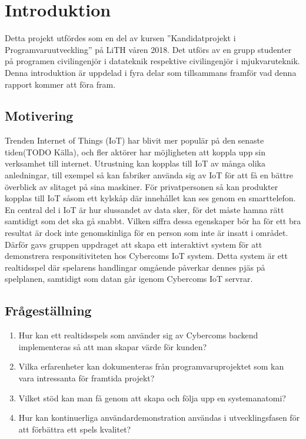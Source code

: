\chapter{Introduktion}
\label{cha:introduction}

Detta projekt utfördes som en del av kursen ''Kandidatprojekt i Programvaruutveckling'' på LiTH våren 2018. Det utförs av en grupp studenter på programen civilingenjör i datateknik respektive civilingenjör i mjukvaruteknik. 
Denna introduktion är uppdelad i fyra delar som tillsammans framför vad denna rapport kommer att föra fram. 

\section{Motivering}
\label{sec:motivation}
Trenden Internet of Things (IoT) har blivit mer populär på den senaste tiden(TODO Källa), och fler aktörer har möjligheten att koppla upp sin verksamhet till internet. Utrustning kan kopplas till IoT av många olika anledningar, till exempel så kan fabriker använda sig av IoT för att få en bättre överblick av slitaget på sina maskiner. För privatpersonen så kan produkter kopplas till IoT såsom ett kylskåp där innehållet kan ses genom en smarttelefon. En central del i IoT är hur slussandet av data sker, för det måste hamna rätt samtidigt som det ska gå snabbt. Vilken siffra dessa egenskaper bör ha för ett bra resultat är dock inte genomskinliga för en person som inte är insatt i området. Därför gavs gruppen uppdraget att skapa ett interaktivt system för att demonstrera responsitiviteten hos Cybercoms IoT system. Detta system är ett realtidsspel där spelarens handlingar omgående påverkar dennes pjäs på spelplanen, samtidigt som datan går igenom Cybercoms IoT servrar.


\section{Frågeställning}

\begin{enumerate}
	\item Hur kan ett realtidsspels som använder sig av Cybercoms backend implementeras så att man skapar värde för kunden?
	\item Vilka erfarenheter kan dokumenteras från programvaruprojektet som kan vara intressanta för framtida projekt?
	\item Vilket stöd kan man få genom att skapa och följa upp en systemanatomi?
	\item Hur kan kontinuerliga användardemonstration användas i utvecklingsfasen för att förbättra ett spels kvalitet?

\end{enumerate}

